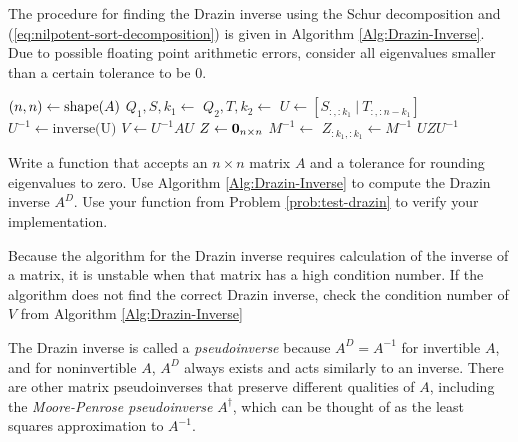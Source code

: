The procedure for finding the Drazin inverse using the Schur decomposition and (\ref{eq:nilpotent-sort-decomposition}) is given in Algorithm \ref{Alg:Drazin-Inverse}.
Due to possible floating point arithmetic errors, consider all eigenvalues smaller than a certain tolerance to be $0$.

\begin{algorithm}[H]
\begin{algorithmic}[1]
    \State $(n,n) \gets \mathrm{shape}(A)$
    \State $Q_1,S,k_1 \gets $ 
    \State $Q_2,T,k_2 \gets $ 
    \State $U \gets [S_{:,:k_1}\ |\ T_{:,:n - k_1}]$
    \State $U^{-1} \gets \text{inverse(U)}$
    \State $V \gets U^{-1}AU$
    \State $Z \gets \mathbf{0}_{n\times n}$
        \State $M^{-1} \gets $ 
        \State $Z_{:k_1,:k_1} \gets M^{-1}$
    \EndIf
    \State {} $UZU^{-1}$
\EndProcedure
\end{algorithmic}
\caption{}
\label{Alg:Drazin-Inverse}
\end{algorithm}

\begin{problem} %
Write a function that accepts an $n \times n$ matrix $A$ and a tolerance for rounding eigenvalues to zero.
Use Algorithm \ref{Alg:Drazin-Inverse} to compute the Drazin inverse $A^D$.
Use your function from Problem \ref{prob:test-drazin} to verify your implementation.
\end{problem}

\begin{warn} %
Because the algorithm for the Drazin inverse requires calculation of the inverse of a matrix, it is unstable when that matrix has a high condition number.
If the algorithm does not find the correct Drazin inverse, check the condition number of $V$ from Algorithm \ref{Alg:Drazin-Inverse}
\end{warn}

\begin{info}
The Drazin inverse is called a \emph{pseudoinverse} because $A^D = A^{-1}$ for invertible $A$, and for noninvertible $A$, $A^D$ always exists and acts similarly to an inverse.
There are other matrix pseudoinverses that preserve different qualities of $A$, including the \emph{Moore-Penrose pseudoinverse} $A^\dagger$, which can be thought of as the least squares approximation to $A^{-1}$.
\end{info}

